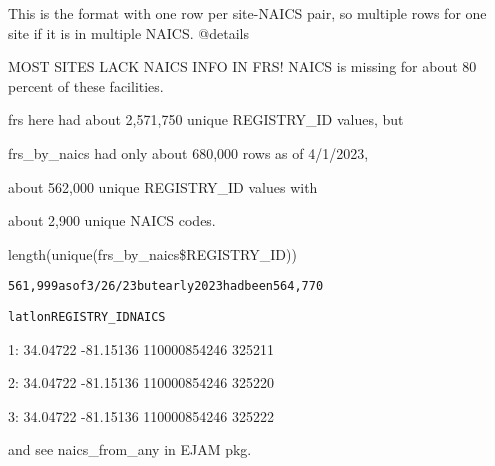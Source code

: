 \documentclass[a4paper]{book}
\begin{document}
%
\begin{Description}\relax
This is the format with one row per site-NAICS pair,
so multiple rows for one site if it is in multiple NAICS.
@details

MOST SITES LACK NAICS INFO IN FRS! NAICS is missing for about 80 percent of these facilities.

frs here had about 2,571,750 unique REGISTRY\_ID values, but

frs\_by\_naics had only about 680,000 rows as of 4/1/2023,

about 562,000 unique REGISTRY\_ID values with

about 2,900 unique NAICS codes.

length(unique(frs\_by\_naics\$REGISTRY\_ID))




\begin{alltt} 561,999  as of 3/26/23 but early 2023 had been 564,770


    lat       lon  REGISTRY_ID  NAICS
\end{alltt}


1: 34.04722 -81.15136 110000854246 325211

2: 34.04722 -81.15136 110000854246 325220

3: 34.04722 -81.15136 110000854246 325222
\end{Description}
%
\begin{SeeAlso}\relax
{}    and see naics\_from\_any in EJAM pkg.
\end{SeeAlso}
%
\end{document}
